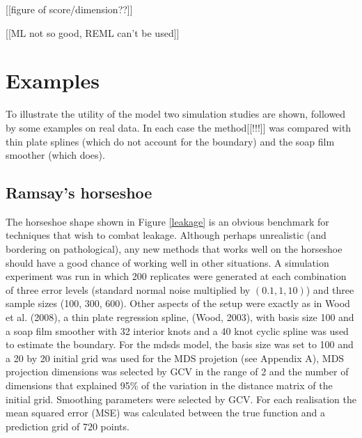 \documentclass[useAMS,referee]{biom}
\begin{document}
[[figure of score/dimension??]]

[[ML not so good, REML can't be used]]

\section{Examples}
\label{examples}

To illustrate the utility of the model two simulation studies are shown, followed by some examples on real data. In each case the method[[!!!]] was compared with thin plate splines (which do not account for the boundary) and the soap film smoother (which does).

\subsection{Ramsay's horseshoe}

The horseshoe shape shown in Figure \ref{leakage} is an obvious benchmark for techniques that wish to combat leakage. Although perhaps unrealistic (and bordering on pathological), any new methods that works well on the horseshoe should have a good chance of working well in other situations. A simulation experiment was run in which 200 replicates were generated at each combination of three error levels (standard normal noise multiplied by $(0.1,1,10)$) and three sample sizes (100, 300, 600). Other aspects of the setup were exactly as in Wood et al. (2008), a thin plate regression spline, (Wood, 2003), with basis size 100 and a soap film smoother with 32 interior knots  and a 40 knot cyclic  spline was used to estimate the boundary. For the mdsds model, the basis size was set to 100 and a 20 by 20 initial grid was used for the MDS projetion (see Appendix A), MDS projection dimensions was selected by GCV in the range of 2 and the number of dimensions that explained 95\% of the variation in the distance matrix of the initial grid. Smoothing parameters were selected by GCV. For each realisation the mean squared error (MSE) was calculated between the true function and a prediction grid of 720 points.
\end{document}
